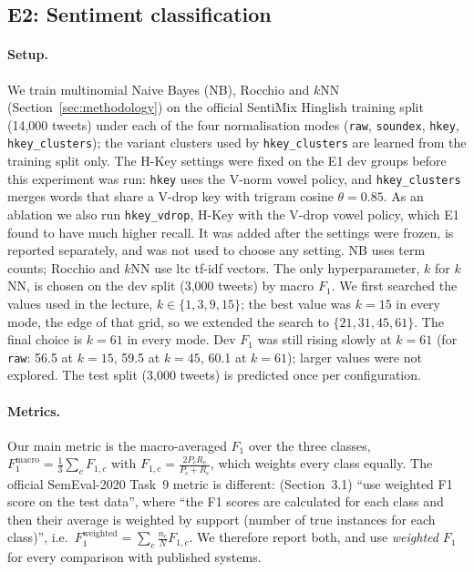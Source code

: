 
\subsection{E2: Sentiment classification}
\label{sec:e2}

\paragraph{Setup.}
We train multinomial Naive Bayes (NB), Rocchio and $k$NN (Section~\ref{sec:methodology}) on the
official SentiMix Hinglish training split (14{,}000 tweets) under each of the four normalisation
modes (\texttt{raw}, \texttt{soundex}, \texttt{hkey}, \texttt{hkey\_clusters}); the variant clusters
used by \texttt{hkey\_clusters} are learned from the training split only. The H-Key settings were
fixed on the E1 dev groups before this experiment was run: \texttt{hkey} uses the V-norm vowel
policy, and \texttt{hkey\_clusters} merges words that share a V-drop key with trigram cosine
$\theta=0.85$. As an ablation we also run \texttt{hkey\_vdrop}, H-Key with the V-drop vowel policy,
which E1 found to have much higher recall. It was added after the settings were frozen, is reported
separately, and was not used to choose any setting. NB uses term counts;
Rocchio and $k$NN use ltc tf-idf vectors. The only hyperparameter, $k$ for $k$NN, is chosen on the
dev split (3{,}000 tweets) by macro $F_1$. We first searched the values used in the lecture,
$k\in\{1,3,9,15\}$; the best value was $k=15$ in every mode, the edge of that grid, so we extended
the search to $\{21,31,45,61\}$. The final choice is $k=61$ in every mode. Dev $F_1$ was still
rising slowly at $k=61$ (for \texttt{raw}: 56.5 at $k=15$, 59.5 at $k=45$, 60.1 at $k=61$); larger
values were not explored. The test split (3{,}000 tweets) is predicted once per configuration.

\paragraph{Metrics.}
Our main metric is the macro-averaged $F_1$ over the three classes,
$F_1^{\text{macro}}=\frac{1}{3}\sum_{c} F_{1,c}$ with $F_{1,c}=\frac{2P_cR_c}{P_c+R_c}$, which weights
every class equally. The official SemEval-2020 Task~9 metric is different: \citet{patwa2020semeval}
(Section~3.1) ``use weighted F1 score on the test data'', where ``the F1 scores are calculated for
each class and then their average is weighted by support (number of true instances for each class)'',
i.e.\ $F_1^{\text{weighted}}=\sum_c \frac{n_c}{N}F_{1,c}$. We therefore report both, and use
\emph{weighted} $F_1$ for every comparison with published systems.

